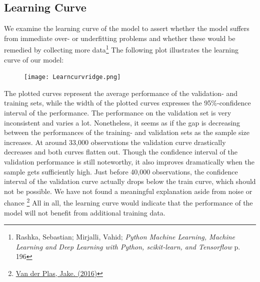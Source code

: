 \documentclass[12pt,a4paper]{article}
\begin{document}
\subsection{Learning Curve}
We examine the learning curve of the model to assert whether the model suffers from immediate over- or underfitting problems and whether these would be remedied by collecting more data\footnote{Rashka, Sebastian; Mirjalli, Vahid; \textit{Python Machine Learning, Machine Learning and Deep Learning with Python, scikit-learn, and Tensorflow} p. 196}
The following plot illustrates the learning curve of our model:
\begin{figure}[H]
\centering
\caption{}
\texttt{[image: Learncurvridge.png]}
\end{figure}
The plotted curves represent the average performance of the validation- and training sets, while the width of the plotted curves expresses the 95\%-confidence interval of the performance.  
The performance on the validation set is very inconsistent and varies a lot. Nonetheless, it seems as if the gap is decreasing between the performances of the training- and validation sets as the sample size increases. 
At around 33,000 observations the validation curve drastically decreases and both curves flatten out. Though the confidence interval of the validation performance is still noteworthy, it also improves dramatically when the sample gets sufficiently high. Just before 40,000 observations, the confidence interval of the validation curve actually drops below the train curve, which should not be possible. We have not found a meaningful explanation aside from noise or chance \footnote{\href{https://jakevdp.github.io/PythonDataScienceHandbook/05.03-hyperparameters-and-model-validation.html?fbclid=IwAR22jhu2nrTY3eJME4VTuTSLXNKqNMmPzlwU4-IJ8VvEMIsLy05-IqgQdsI}{Van der Plas, Jake. (2016)}} 
All in all, the learning curve would indicate that the performance of the model will not benefit from additional training data. 
\end{document}
